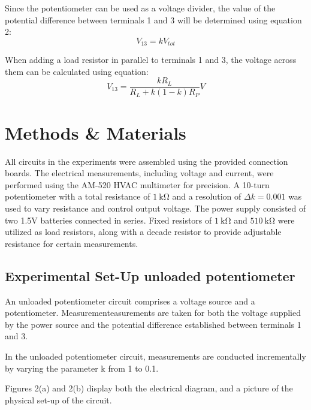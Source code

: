 \documentclass[a4paper]{article}
\newcommand{\unit}[1]{~\mathrm{#1}}
\begin{document}
Since the potentiometer can be used as a voltage divider, the value of the
potential difference between terminals 1 and 3 will be determined using equation
2\cite{report}:
\begin{equation}
    V_{13} = k V_{tot}
\end{equation} 

When adding a load resistor in parallel to terminals 1 and 3, the voltage across
them can be calculated using equation\cite{report}:
\begin{equation}
    V_{13} = \frac{kR_{L}}{R_{L}+k(1-k)R_P} V
\end{equation}
\section{Methods \& Materials}
All circuits in the experiments were assembled using the provided connection boards. 
The electrical measurements, including voltage and current, were performed using the AM-520 
HVAC multimeter for precision. 
A 10-turn potentiometer with a total resistance of $1 \unit{k\Omega}$ and a resolution of $\Delta k = 0.001$ 
was used to vary resistance and control output voltage. 
The power supply consisted of two 1.5V batteries connected in series. 
Fixed resistors of $1 \unit{k\Omega}$  and $510 \unit{k\Omega}$  were utilized as load resistors, 
along with a decade resistor to provide 
adjustable resistance for certain measurements.


\newpage
\subsection{Experimental Set-Up unloaded potentiometer}
An unloaded potentiometer circuit comprises a voltage source and a potentiometer.
Measurementeasurements are taken for both the voltage supplied by the power source
and the potential difference established between terminals 1 and 3. 

In the unloaded potentiometer circuit, measurements are conducted incrementally by varying the parameter 
k from 1 to 0.1. 

Figures 2(a) and 2(b) display both
the electrical diagram, and a picture of the physical set-up of the circuit.
\end{document}
